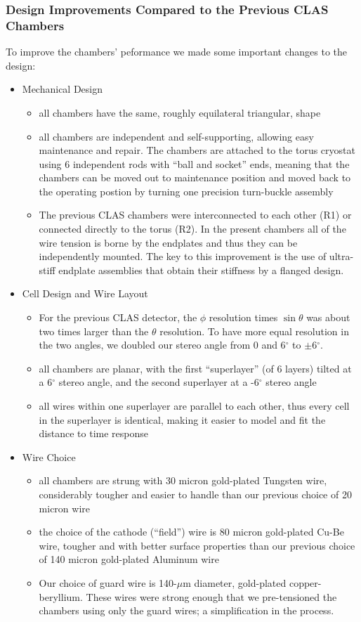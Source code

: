 \subsubsection{Design Improvements Compared to the Previous CLAS Chambers}
To improve the chambers' peformance we made some important changes to the design:
\begin{itemize}
\item Mechanical Design
\begin{itemize}
\item all chambers have the same, roughly equilateral triangular, shape
\item all chambers are independent and self-supporting, allowing easy
maintenance and repair.  The chambers are attached to the torus cryostat using 6 independent
rods with ``ball and socket'' ends, meaning that the chambers can be
moved out to maintenance position and moved back to the operating 
postion by turning one precision turn-buckle assembly
\item The previous CLAS chambers were interconnected to each other (R1) or 
connected directly to the torus (R2).  In the present chambers all of the wire tension
is borne by the endplates and thus they can be independently mounted.
The key to this improvement is the use of  
ultra-stiff endplate assemblies that obtain their stiffness 
by a flanged design.
\end{itemize}
\item Cell Design and Wire Layout
\begin{itemize}  
\item For the previous CLAS detector, the $\phi$ resolution times $\sin \theta$ was about two 
times larger than the $\theta$ resolution.  To have more equal resolution in 
the two angles, we doubled our stereo angle from 0 and 6$^\circ$ to 
$\pm$6$^\circ$.
\item all chambers are planar, with the first ``superlayer'' (of 6 layers)
tilted at a 6$^\circ$ stereo angle, and the second superlayer at a -6$^\circ$ stereo
angle
\item all wires within one superlayer are parallel to each other, thus
every cell in the superlayer is identical, making it easier to model
and fit the distance to time response
\end{itemize}
\item Wire Choice
\begin{itemize}
\item all chambers are strung with 30 micron gold-plated Tungsten wire,
considerably tougher and easier to handle than our previous choice 
of 20 micron wire
\item the choice of the cathode (``field'') wire is 80 micron gold-plated
Cu-Be wire, tougher and with better surface properties than our previous
choice of 140 micron gold-plated Aluminum wire
\item  Our choice of guard wire is 140-$\mu$m diameter, gold-plated
copper-beryllium.  These wires were strong enough that we pre-tensioned 
the chambers using only the guard wires; a simplification in the process.
\end{itemize}
\end{itemize}



